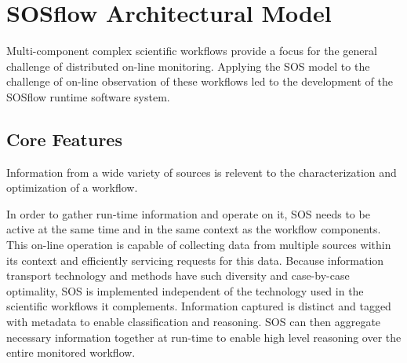 
\section{SOSflow Architectural Model}
%
%
Multi-component complex scientific workflows provide a focus for the
general challenge of distributed on-line monitoring.
%
Applying the SOS model to the challenge of on-line observation of
these workflows led to the development of the SOSflow runtime software
system.
%
\subsection{Core Features}
%
%
%
%
%
%
%
%
%
Information from a wide variety of sources is relevent to the
characterization and optimization of a workflow.
%
\par
%
In order to gather run-time information and operate on it, SOS needs
to be active at the same time and in the same context as the workflow
components.
%
This on-line operation is capable of collecting data from multiple
sources within its context and efficiently servicing requests
for this data.
%
Because information transport technology and methods have such
diversity and case-by-case optimality, SOS is implemented
independent of the technology used in the scientific workflows it
complements.
%
Information captured is distinct and tagged with metadata to enable
classification and reasoning.
%
SOS can then aggregate necessary information together at run-time to
enable high level reasoning over the entire monitored workflow.
%
%
%
